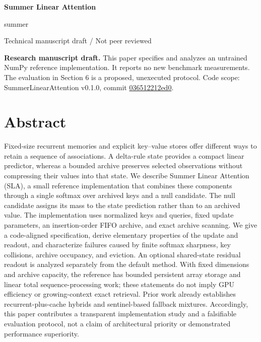 \documentclass[11pt,a4paper]{article}
\begin{document}
\thispagestyle{plain}
\begin{center}
{\fontsize{21}{25}\selectfont\bfseries Summer Linear Attention\par}
\vspace{5pt}{\large A Reference Study of Delta-State Memory with Bounded KV Retrieval\par}
\vspace{10pt}
{\normalsize summer\par}
\vspace{3pt}{\small 24 October 2026\par}
\vspace{5pt}
{\small\sffamily\color{Muted} Technical manuscript draft / Not peer reviewed\par}
\end{center}
\vspace{3pt}
\textbf{Research manuscript draft.} This paper specifies and analyzes an untrained NumPy reference implementation. It reports no new benchmark measurements. The evaluation in Section 6 is a proposed, unexecuted protocol. Code scope: SummerLinearAttention v0.1.0, commit \href{https://github.com/Summer110622/SummerLinearAttention/tree/036512212ed0f7d2456988cb4b523599064a7e6f}{036512212ed0}.

\section{Abstract}\label{abstract}

Fixed-size recurrent memories and explicit key--value stores offer different ways to retain a sequence of associations. A delta-rule state provides a compact linear predictor, whereas a bounded archive preserves selected observations without compressing their values into that state. We describe Summer Linear Attention (SLA), a small reference implementation that combines these components through a single softmax over archived keys and a null candidate. The null candidate assigns its mass to the state prediction rather than to an archived value. The implementation uses normalized keys and queries, fixed update parameters, an insertion-order FIFO archive, and exact archive scanning. We give a code-aligned specification, derive elementary properties of the update and readout, and characterize failures caused by finite softmax sharpness, key collisions, archive occupancy, and eviction. An optional shared-state residual readout is analyzed separately from the default method. With fixed dimensions and archive capacity, the reference has bounded persistent array storage and linear total sequence-processing work; these statements do not imply GPU efficiency or growing-context exact retrieval. Prior work already establishes recurrent-plus-cache hybrids and sentinel-based fallback mixtures. Accordingly, this paper contributes a transparent implementation study and a falsifiable evaluation protocol, not a claim of architectural priority or demonstrated performance superiority.
\end{document}
